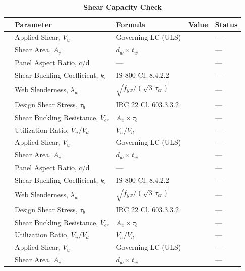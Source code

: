 \documentclass[12pt,a4paper]{report}
\numberwithin{table}{chapter}
\numberwithin{figure}{chapter}
\begin{document}
\vspace{1em}
\begin{longtable}{|C{2.5cm}|C{3.5cm}|C{3.5cm}|>{\centering\arraybackslash}p{4.2cm}|C{1.8cm}|}
\caption{\textbf{Shear Capacity Check}}
\hline
\textbf{} & \textbf{Parameter} & \textbf{Formula} & \textbf{Value} & \textbf{Status} \\[6pt]
\hline
{} & Applied Shear, $V_u$ & Governing LC (ULS) &  & --- \\[6pt]
 & Shear Area, $A_v$ & $d_w \times t_w$ &  & --- \\[6pt]
 & Panel Aspect Ratio, c/d & --- &  & --- \\[6pt]
 & Shear Buckling Coefficient, $k_v$ & IS 800 Cl. 8.4.2.2 &  & --- \\[6pt]
 & Web Slenderness, $\lambda_w$ & $\sqrt{f_{yw}/(\sqrt{3}\,\tau_{cr})}$ &  & --- \\[6pt]
 & Design Shear Stress, $\tau_b$ & IRC 22 Cl. 603.3.3.2 &  & --- \\[6pt]
 & Shear Buckling Resistance, $V_{cr}$ & $A_v \times \tau_b$ &  & --- \\[6pt]
 & Utilization Ratio, $V_u / V_d$ & $V_u / V_d$ &  & --- \\[6pt]
\hline
{} & Applied Shear, $V_u$ & Governing LC (ULS) &  & --- \\[6pt]
 & Shear Area, $A_v$ & $d_w \times t_w$ &  & --- \\[6pt]
 & Panel Aspect Ratio, c/d & --- &  & --- \\[6pt]
 & Shear Buckling Coefficient, $k_v$ & IS 800 Cl. 8.4.2.2 &  & --- \\[6pt]
 & Web Slenderness, $\lambda_w$ & $\sqrt{f_{yw}/(\sqrt{3}\,\tau_{cr})}$ &  & --- \\[6pt]
 & Design Shear Stress, $\tau_b$ & IRC 22 Cl. 603.3.3.2 &  & --- \\[6pt]
 & Shear Buckling Resistance, $V_{cr}$ & $A_v \times \tau_b$ &  & --- \\[6pt]
 & Utilization Ratio, $V_u / V_d$ & $V_u / V_d$ &  & --- \\[6pt]
\hline
{} & Applied Shear, $V_u$ & Governing LC (ULS) &  & --- \\[6pt]
 & Shear Area, $A_v$ & $d_w \times t_w$ &  & --- \\[6pt]

\end{longtable}
\end{document}
